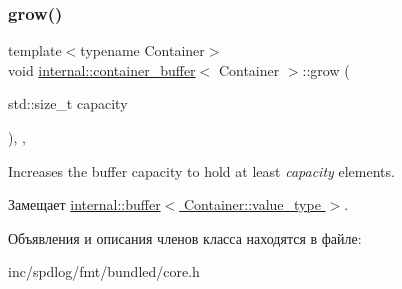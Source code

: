 \subsubsection{\texorpdfstring{grow()}{grow()}}
{\footnotesize\ttfamily template$<$typename Container$>$ \\
void \hyperlink{classinternal_1_1container__buffer}{internal\+::container\+\_\+buffer}$<$ Container $>$\+::grow (\begin{DoxyParamCaption}\item[{std\+::size\+\_\+t}]{capacity }\end{DoxyParamCaption})\hspace{0.3cm}{\ttfamily [inline]}, {\ttfamily [protected]}, {\ttfamily [virtual]}}

Increases the buffer capacity to hold at least {\itshape capacity} elements. 

Замещает \hyperlink{classinternal_1_1buffer_a38f53be20945474be4f60b58b9b4cc54}{internal\+::buffer$<$ Container\+::value\+\_\+type $>$}.



Объявления и описания членов класса находятся в файле\+:\begin{DoxyCompactItemize}
\item 
inc/spdlog/fmt/bundled/core.\+h\end{DoxyCompactItemize}
